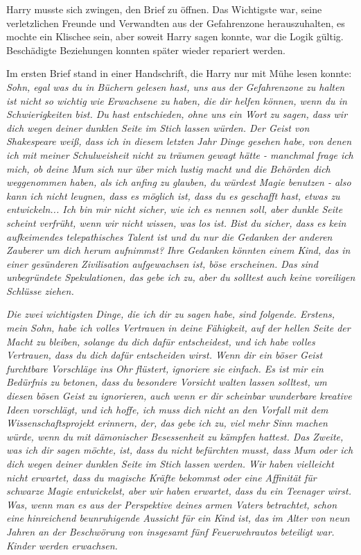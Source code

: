 Harry musste sich zwingen, den Brief zu öffnen. Das Wichtigste war, seine
verletzlichen Freunde und Verwandten aus der Gefahrenzone herauszuhalten, es
mochte ein Klischee sein, aber soweit Harry sagen konnte, war die Logik gültig.
Beschädigte Beziehungen konnten später wieder repariert werden.

Im ersten Brief stand in einer Handschrift, die Harry nur mit Mühe lesen konnte:
\emph{Sohn, egal was du in Büchern gelesen hast, uns aus der Gefahrenzone zu
halten ist nicht so wichtig wie Erwachsene zu haben, die dir helfen können, wenn
du in Schwierigkeiten bist. Du hast entschieden, ohne uns ein Wort zu sagen,
dass wir dich wegen deiner \glqq{}dunklen Seite\grqq{} im Stich lassen würden.
Der Geist von Shakespeare weiß, dass ich in diesem letzten Jahr Dinge gesehen
habe, von denen ich mit meiner Schulweisheit nicht zu träumen gewagt hätte -
manchmal frage ich mich, ob deine Mum sich nur über mich lustig macht und die
Behörden dich weggenommen haben, als ich anfing zu glauben, du würdest Magie
benutzen - also kann ich nicht leugnen, dass es möglich ist, dass du es
geschafft hast, etwas zu entwickeln... Ich bin mir nicht sicher, wie ich es
nennen soll, aber \glqq{}dunkle Seite\grqq{} scheint verfrüht, wenn wir nicht
wissen, was los ist. Bist du sicher, dass es kein aufkeimendes telepathisches
Talent ist und du nur die Gedanken der anderen Zauberer um dich herum aufnimmst?
Ihre Gedanken könnten einem Kind, das in einer gesünderen Zivilisation
aufgewachsen ist, böse erscheinen. Das sind unbegründete Spekulationen, das gebe
ich zu, aber du solltest auch keine voreiligen Schlüsse ziehen.}

\emph{Die zwei wichtigsten Dinge, die ich dir zu sagen habe, sind folgende.
Erstens, mein Sohn, habe ich volles Vertrauen in deine Fähigkeit, auf der hellen
Seite der Macht zu bleiben, solange du dich dafür entscheidest, und ich habe
volles Vertrauen, dass du dich dafür entscheiden wirst. Wenn dir ein böser Geist
furchtbare Vorschläge ins Ohr flüstert, ignoriere sie einfach. Es ist mir ein
Bedürfnis zu betonen, dass du besondere Vorsicht walten lassen solltest, um
diesen bösen Geist zu ignorieren, auch wenn er dir scheinbar wunderbare kreative
Ideen vorschlägt, und ich hoffe, ich muss dich nicht an den Vorfall mit dem
Wissenschaftsprojekt erinnern, der, das gebe ich zu, viel mehr Sinn machen
würde, wenn du mit dämonischer Besessenheit zu kämpfen hattest. Das Zweite, was
ich dir sagen möchte, ist, dass du nicht befürchten musst, dass Mum oder ich
dich wegen deiner \glqq{}dunklen Seite\grqq{} im Stich lassen werden. Wir haben
vielleicht nicht erwartet, dass du magische Kräfte bekommst oder eine Affinität
für schwarze Magie entwickelst, aber wir haben erwartet, dass du ein Teenager
wirst. Was, wenn man es aus der Perspektive deines armen Vaters betrachtet,
schon eine hinreichend beunruhigende Aussicht für ein Kind ist, das im Alter von
neun Jahren an der Beschwörung von insgesamt fünf Feuerwehrautos beteiligt war.
}
\emph{Kinder werden erwachsen.}

